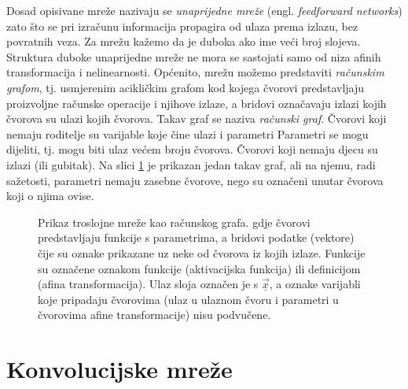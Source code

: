 \documentclass[utf8, diplomski, lmodern]{fer}
\begin{document}
Dosad opisivane mreže nazivaju se \emph{unaprijedne mreže} (engl. \textit{feedforward networks}) zato što se pri izračunu informacija propagira od ulaza prema izlazu, bez povratnih veza. Za mrežu kažemo da je duboka ako ime veći broj slojeva. Struktura duboke unaprijedne mreže ne mora se sastojati samo od niza afinih transformacija i nelinearnosti. Općenito, mrežu možemo predstaviti \emph{računskim grafom}, tj. usmjerenim acikličkim grafom kod kojega čvorovi predstavljaju proizvoljne računske operacije i njihove izlaze, a bridovi označavaju izlazi kojih čvorova su ulazi kojih čvorova. Takav graf se naziva \emph{računski graf}. Čvorovi koji nemaju roditelje su varijable koje čine ulazi i parametri Parametri se mogu dijeliti, tj. mogu biti ulaz većem broju čvorova. Čvorovi koji nemaju djecu su izlazi (ili gubitak). Na slici \ref{fig:racunski-graf} je prikazan jedan takav graf, ali na njemu, radi sažetosti, parametri nemaju zasebne čvorove, nego su označeni unutar čvorova koji o njima ovise.

\begin{figure}
\centering
{}
\caption{Prikaz troslojne mreže kao računskog grafa. gdje čvorovi predstavljaju funkcije s parametrima, a bridovi podatke (vektore) čije su oznake prikazane uz neke od čvorova iz kojih izlaze. Funkcije su označene oznakom funkcije (aktivacijska funkcija) ili definicijom (afina transformacija). Ulaz sloja označen je s $\underline{\vec x}$, a oznake varijabli koje pripadaju čvorovima (ulaz u ulaznom čvoru i parametri u čvorovima afine transformacije) nisu podvučene.}
\label{fig:racunski-graf}
\end{figure}


\section{Konvolucijske mreže}
\end{document}
